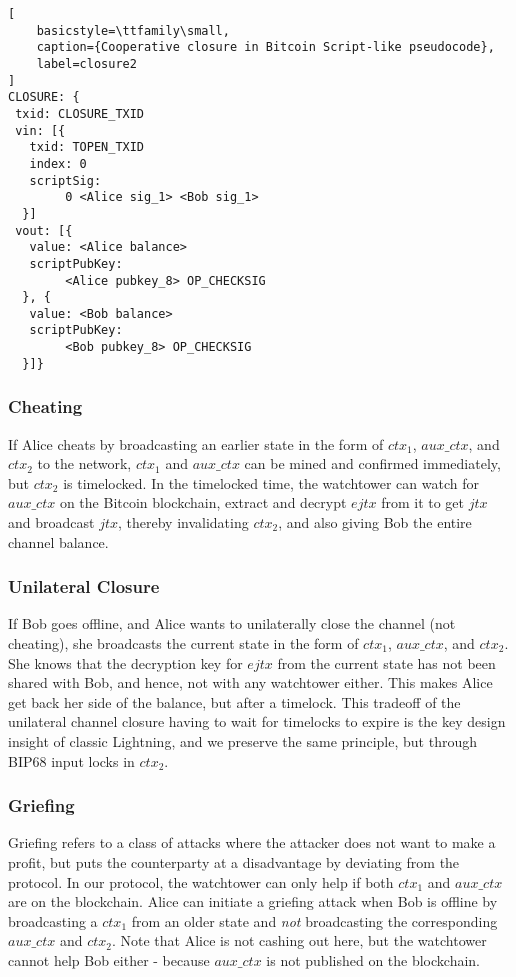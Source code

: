 \begin{lstlisting}[
    basicstyle=\ttfamily\small,
    caption={Cooperative closure in Bitcoin Script-like pseudocode},
    label=closure2
]
CLOSURE: {
 txid: CLOSURE_TXID
 vin: [{
   txid: TOPEN_TXID
   index: 0
   scriptSig: 
        0 <Alice sig_1> <Bob sig_1>
  }]
 vout: [{
   value: <Alice balance>
   scriptPubKey: 
        <Alice pubkey_8> OP_CHECKSIG
  }, {
   value: <Bob balance>
   scriptPubKey: 
        <Bob pubkey_8> OP_CHECKSIG
  }]}
\end{lstlisting}


\subsubsection{Cheating}
If Alice cheats by broadcasting an earlier state in the form of $\mathit{ctx_1}$, $\mathit{aux\_ctx}$, and $\mathit{ctx_2}$ to the network, $\mathit{ctx_1}$ and $\mathit{aux\_ctx}$ can be mined and confirmed immediately, but $\mathit{ctx_2}$ is timelocked. In the timelocked time, the watchtower can watch for $\mathit{aux\_ctx}$ on the Bitcoin blockchain, extract and decrypt $\mathit{ejtx}$ from it to get $\mathit{jtx}$ and broadcast $\mathit{jtx}$, thereby invalidating $\mathit{ctx_2}$, and also giving Bob the entire channel balance.

\subsubsection{Unilateral Closure}
If Bob goes offline, and Alice wants to unilaterally close the channel (not cheating), she broadcasts the current state in the form of $\mathit{ctx_1}$, $\mathit{aux\_ctx}$, and $\mathit{ctx_2}$. She knows that the decryption key for $\mathit{ejtx}$ from the current state has not been shared with Bob, and hence, not with any watchtower either. This makes Alice get back her side of the balance, but after a timelock. This tradeoff of the unilateral channel closure having to wait for timelocks to expire is the key design insight of classic Lightning, and we preserve the same principle, but through BIP68 input locks in $\mathit{ctx_2}$.

\subsubsection{Griefing}
Griefing refers to a class of attacks where the attacker does not want to make a profit, but puts the counterparty at a disadvantage by deviating from the protocol. In our protocol, the watchtower can only help if both $\mathit{ctx_1}$ and $\mathit{aux\_ctx}$ are on the blockchain. Alice can initiate a griefing attack when Bob is offline by broadcasting a $\mathit{ctx_1}$ from an older state and \textit{not} broadcasting the corresponding $\mathit{aux\_ctx}$ and $\mathit{ctx_2}$. Note that Alice is not cashing out here, but the watchtower cannot help Bob either - because $\mathit{aux\_ctx}$ is not published on the blockchain.

